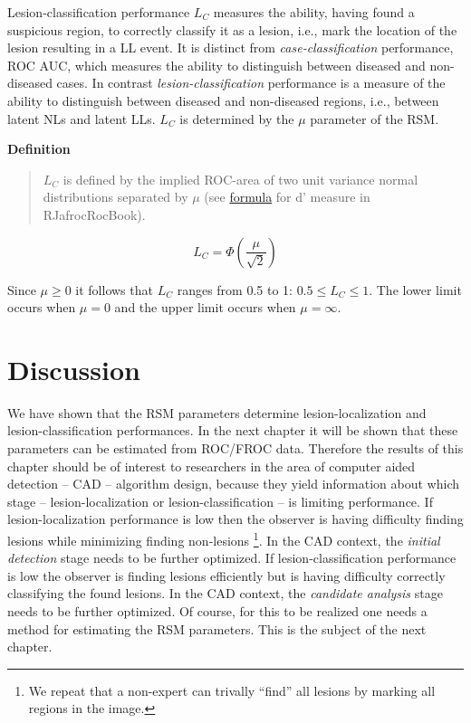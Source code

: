 \documentclass[
]{book}
\begin{document}
Lesion-classification performance \(L_C\) measures the ability, having found a suspicious region, to correctly classify it as a lesion, i.e., mark the location of the lesion resulting in a LL event. It is distinct from \emph{case-classification} performance, ROC AUC, which measures the ability to distinguish between diseased and non-diseased cases. In contrast \emph{lesion-classification} performance is a measure of the ability to distinguish between diseased and non-diseased regions, i.e., between latent NLs and latent LLs. \(L_C\) is determined by the \(\mu\) parameter of the RSM.

\textbf{Definition}

\begin{quote}
\(L_C\) is defined by the implied ROC-area of two unit variance normal distributions separated by \(\mu\) (see \href{https://dpc10ster.github.io/RJafrocRocBook/binormal-model.html\#binormal-model-d-prime}{formula} for d' measure in RJafrocRocBook).
\end{quote}

\begin{equation}
L_C=\Phi\left ( \frac{\mu}{\sqrt{2}} \right )
\label{eq:rsm-search-classification-classification-performance}
\end{equation}

Since \(\mu \ge 0\) it follows that \(L_C\) ranges from 0.5 to 1: \(0.5 \le L_C \le 1\). The lower limit occurs when \(\mu = 0\) and the upper limit occurs when \(\mu = \infty\).

\hypertarget{rsm-search-classification-discussion}{%
\section{Discussion}\label{rsm-search-classification-discussion}}

We have shown that the RSM parameters determine lesion-localization and lesion-classification performances. In the next chapter it will be shown that these parameters can be estimated from ROC/FROC data. Therefore the results of this chapter should be of interest to researchers in the area of computer aided detection -- CAD -- algorithm design, because they yield information about which stage -- lesion-localization or lesion-classification -- is limiting performance. If lesion-localization performance is low then the observer is having difficulty finding lesions while minimizing finding non-lesions \footnote{We repeat that a non-expert can trivally ``find'' all lesions by marking all regions in the image.}. In the CAD context, the \emph{initial detection} stage needs to be further optimized. If lesion-classification performance is low the observer is finding lesions efficiently but is having difficulty correctly classifying the found lesions. In the CAD context, the \emph{candidate analysis} stage needs to be further optimized. Of course, for this to be realized one needs a method for estimating the RSM parameters. This is the subject of the next chapter.
\end{document}
